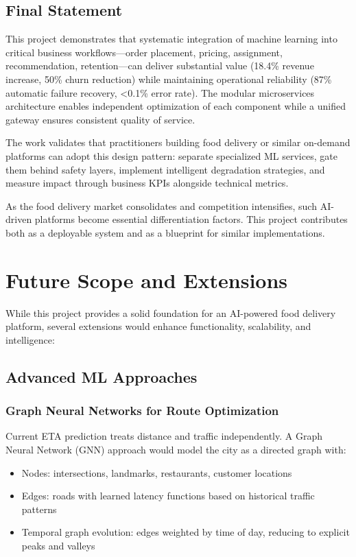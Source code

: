 \documentclass[12pt,a4paper]{report}
\begin{document}
\begin{itemize}
\section{Final Statement}

This project demonstrates that systematic integration of machine learning into critical business workflows—order placement, pricing, assignment, recommendation, retention—can deliver substantial value (18.4\% revenue increase, 50\% churn reduction) while maintaining operational reliability (87\% automatic failure recovery, <0.1\% error rate). The modular microservices architecture enables independent optimization of each component while a unified gateway ensures consistent quality of service.

The work validates that practitioners building food delivery or similar on-demand platforms can adopt this design pattern: separate specialized ML services, gate them behind safety layers, implement intelligent degradation strategies, and measure impact through business KPIs alongside technical metrics.

As the food delivery market consolidates and competition intensifies, such AI-driven platforms become essential differentiation factors. This project contributes both as a deployable system and as a blueprint for similar implementations.

\chapter{Future Scope and Extensions}

While this project provides a solid foundation for an AI-powered food delivery platform, several extensions would enhance functionality, scalability, and intelligence:

\section{Advanced ML Approaches}

\subsection{Graph Neural Networks for Route Optimization}

Current ETA prediction treats distance and traffic independently. A Graph Neural Network (GNN) approach would model the city as a directed graph with:
\begin{itemize}
    \item Nodes: intersections, landmarks, restaurants, customer locations
    \item Edges: roads with learned latency functions based on historical traffic patterns
    \item Temporal graph evolution: edges weighted by time of day, reducing to explicit peaks and valleys
\end{itemize}


\end{itemize}
\end{document}
